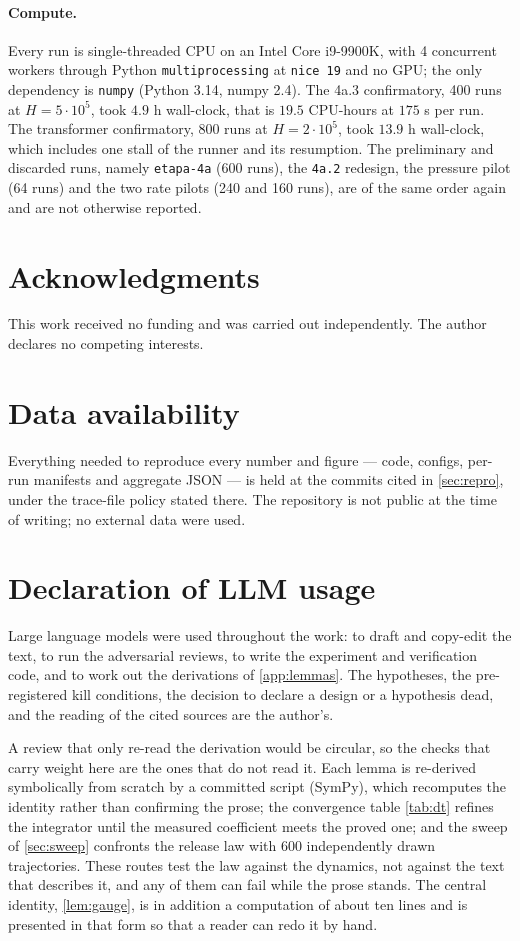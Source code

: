 \documentclass[11pt]{article}
\theoremstyle{definition}
\theoremstyle{remark}
\begin{document}
\paragraph{Compute.}
Every run is single-threaded CPU on an Intel Core i9-9900K, with 4 concurrent
workers through Python \texttt{multiprocessing} at \texttt{nice 19} and no GPU;
the only dependency is \texttt{numpy} (Python 3.14, numpy 2.4). The 4a.3
confirmatory, 400 runs at $H=5\cdot10^{5}$, took $4.9$ h wall-clock, that is
$19.5$ CPU-hours at $175$ s per run. The transformer confirmatory, 800 runs at
$H=2\cdot10^{5}$, took $13.9$ h wall-clock, which includes one stall of the
runner and its resumption. The preliminary and discarded
runs, namely \texttt{etapa-4a} (600 runs), the \texttt{4a.2} redesign, the
pressure pilot (64
runs) and the two rate pilots (240 and 160 runs), are of the same order again and
are not otherwise reported.

\section*{Acknowledgments}
This work received no funding and was carried out independently. The author
declares no competing interests.

\section*{Data availability}
Everything needed to reproduce every number and figure --- code, configs,
per-run manifests and aggregate JSON --- is held at the commits cited in
\cref{sec:repro}, under the trace-file policy stated there. The repository is
not public at the time of writing; no external data were used.

\section*{Declaration of LLM usage} Large language models were used throughout
the work: to draft and copy-edit the text, to run the adversarial reviews, to
write the experiment and verification code, and to work out the derivations of
\cref{app:lemmas}. The hypotheses, the pre-registered kill conditions, the
decision to declare a design or a hypothesis dead, and the reading of the
cited sources are the author's.

A review that only re-read the derivation would be circular, so the checks
that carry weight here are the ones that do not read it. Each lemma is
re-derived symbolically from scratch by a committed script (SymPy), which
recomputes the identity rather than confirming the prose; the convergence
table \cref{tab:dt} refines the integrator until the measured coefficient
meets the proved one; and the sweep of \cref{sec:sweep} confronts the release
law with 600 independently drawn trajectories. These routes test the law
against the dynamics, not against the text that describes it, and any of them
can fail while the prose stands. The central identity, \cref{lem:gauge}, is in
addition a computation of about ten lines and is presented in that form so
that a reader can redo it by hand.
\end{document}
